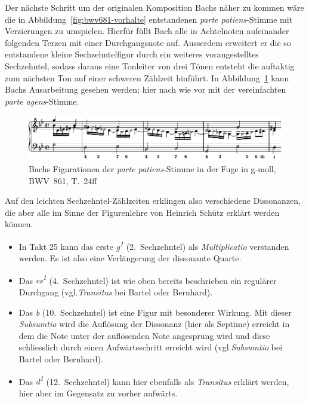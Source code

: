 Der nächste Schritt um der originalen Komposition Bachs näher zu kommen wäre die in Abbildung~\ref{fig:bwv681-vorhalte} entstandenen \emph{parte patiens}-Stimme mit Verzierungen zu umspielen.
Hierfür füllt Bach alle in Achtelnoten aufeinander folgenden Terzen mit einer Durchgangsnote auf.
Ausserdem erweitert er die so entstandene kleine Sechzehntelfigur durch ein weiteres vorangestelltes Sechzehntel, sodass daraus eine Tonleiter von drei Tönen entsteht die auftaktig zum nächsten Ton auf einer schweren Zählzeit hinführt.
In Abbildung~\ref{fig:bwv681-patiens-verziert} kann Bachs Ausarbeitung gesehen werden; hier nach wie vor mit der vereinfachten \emph{parte agens}-Stimme.

\begin{figure}[htbp]
	\centering
	\includegraphics{lilypond/g-moll/render/romanesca-patiens-verziert}
	\caption{Bachs Figurationen der \emph{parte patiens}-Stimme in der Fuge in g-moll, BWV~861, T.~24ff}
	\label{fig:bwv681-patiens-verziert}
\end{figure}

Auf den leichten Sechzehntel-Zählzeiten erklingen also verschiedene Dissonanzen, die aber alle im Sinne der Figurenlehre von Heinrich Schütz\autocite{bernhard:kompositionslehre} erklärt werden können.

\begin{itemize}
\item
	In Takt 25 kann das erste \emph{g\textsuperscript{1}} (2.~Sechzehntel) als \emph{Multiplicatio}\autocite[203f]{bartel:figurenlehre}\autocite[75]{bernhard:kompositionslehre} verstanden werden.
	Es ist also eine Verlängerung der dissonante Quarte.
\item
	Das \emph{es\textsuperscript{1}} (4.~Sechzehntel) ist wie oben bereits beschrieben ein regulärer Durchgang (vgl.\emph{Transitus} bei Bartel\autocite[260ff]{bartel:figurenlehre} oder Bernhard\autocite[64f]{bernhard:kompositionslehre}).
\item
	Das \emph{b} (10.~Sechzehntel) ist eine Figur mit besonderer Wirkung.
	Mit dieser \emph{Subsumtio} wird die Auflösung der Dissonanz (hier als Septime) erreicht in dem die Note unter der auflösenden Note angesprung wird und diese schliesslich durch einen Aufwärtsschritt erreicht wird (vgl.\emph{Subsumtio} bei Bartel\autocite[242ff]{bartel:figurenlehre} oder Bernhard\autocite[148f]{bernhard:kompositionslehre}).
\item
	Das \emph{d\textsuperscript{1}} (12.~Sechzehntel) kann hier ebenfalls als \emph{Transitus} erklärt werden, hier aber im Gegensatz zu vorher aufwärts.
\end{itemize}

